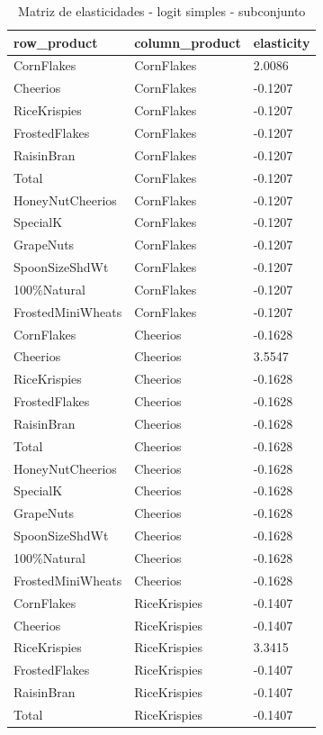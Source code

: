 \begin{table}[!htbp]
\centering
\caption{Matriz de elasticidades - logit simples - subconjunto}
\label{tab:elas-simple-subset}
\scriptsize
\begin{tabular}{lll}
\hline
row\_product & column\_product & elasticity
\\
\hline
CornFlakes & CornFlakes & 2.0086
\\
Cheerios & CornFlakes & -0.1207
\\
RiceKrispies & CornFlakes & -0.1207
\\
FrostedFlakes & CornFlakes & -0.1207
\\
RaisinBran & CornFlakes & -0.1207
\\
Total & CornFlakes & -0.1207
\\
HoneyNutCheerios & CornFlakes & -0.1207
\\
SpecialK & CornFlakes & -0.1207
\\
GrapeNuts & CornFlakes & -0.1207
\\
SpoonSizeShdWt & CornFlakes & -0.1207
\\
100\%Natural & CornFlakes & -0.1207
\\
FrostedMiniWheats & CornFlakes & -0.1207
\\
CornFlakes & Cheerios & -0.1628
\\
Cheerios & Cheerios & 3.5547
\\
RiceKrispies & Cheerios & -0.1628
\\
FrostedFlakes & Cheerios & -0.1628
\\
RaisinBran & Cheerios & -0.1628
\\
Total & Cheerios & -0.1628
\\
HoneyNutCheerios & Cheerios & -0.1628
\\
SpecialK & Cheerios & -0.1628
\\
GrapeNuts & Cheerios & -0.1628
\\
SpoonSizeShdWt & Cheerios & -0.1628
\\
100\%Natural & Cheerios & -0.1628
\\
FrostedMiniWheats & Cheerios & -0.1628
\\
CornFlakes & RiceKrispies & -0.1407
\\
Cheerios & RiceKrispies & -0.1407
\\
RiceKrispies & RiceKrispies & 3.3415
\\
FrostedFlakes & RiceKrispies & -0.1407
\\
RaisinBran & RiceKrispies & -0.1407
\\
Total & RiceKrispies & -0.1407

\end{tabular}
\end{table}
